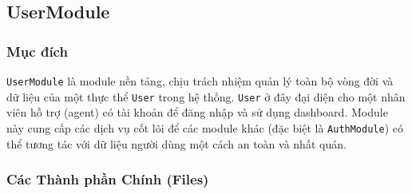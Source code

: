 \subsection{UserModule}
\label{subsec:user-module}

\subsubsection{Mục đích}

\texttt{UserModule} là module nền tảng, chịu trách nhiệm quản lý toàn bộ vòng đời và dữ liệu của một thực thể \texttt{User} trong hệ thống. \texttt{User} ở đây đại diện cho một nhân viên hỗ trợ (agent) có tài khoản để đăng nhập và sử dụng dashboard. Module này cung cấp các dịch vụ cốt lõi để các module khác (đặc biệt là \texttt{AuthModule}) có thể tương tác với dữ liệu người dùng một cách an toàn và nhất quán.

\subsubsection{Các Thành phần Chính (Files)}

